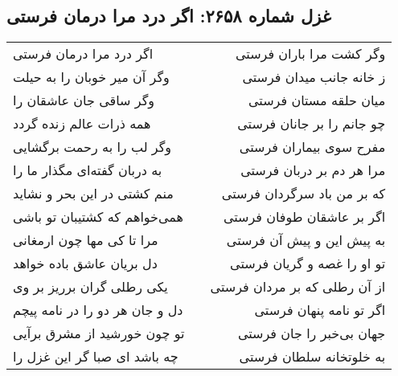\begin{center}
\section*{غزل شماره ۲۶۵۸: اگر درد مرا درمان فرستی}
\label{sec:2658}
\begin{longtable}{l p{0.5cm} r}
اگر درد مرا درمان فرستی
&&
وگر کشت مرا باران فرستی
\\
وگر آن میر خوبان را به حیلت
&&
ز خانه جانب میدان فرستی
\\
وگر ساقی جان عاشقان را
&&
میان حلقه مستان فرستی
\\
همه ذرات عالم زنده گردد
&&
چو جانم را بر جانان فرستی
\\
وگر لب را به رحمت برگشایی
&&
مفرح سوی بیماران فرستی
\\
به دربان گفته‌ای مگذار ما را
&&
مرا هر دم بر دربان فرستی
\\
منم کشتی در این بحر و نشاید
&&
که بر من باد سرگردان فرستی
\\
همی‌خواهم که کشتیبان تو باشی
&&
اگر بر عاشقان طوفان فرستی
\\
مرا تا کی مها چون ارمغانی
&&
به پیش این و پیش آن فرستی
\\
دل بریان عاشق باده خواهد
&&
تو او را غصه و گریان فرستی
\\
یکی رطلی گران برریز بر وی
&&
از آن رطلی که بر مردان فرستی
\\
دل و جان هر دو را در نامه پیچم
&&
اگر تو نامه پنهان فرستی
\\
تو چون خورشید از مشرق برآیی
&&
جهان بی‌خبر را جان فرستی
\\
چه باشد ای صبا گر این غزل را
&&
به خلوتخانه سلطان فرستی
\\
\end{longtable}
\end{center}
